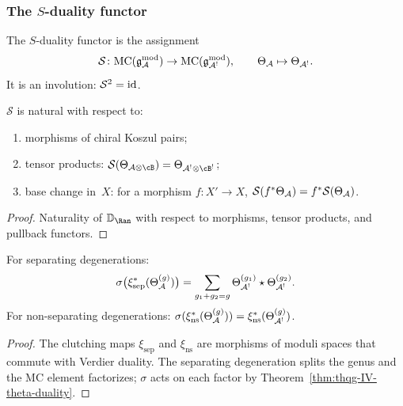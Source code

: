 \subsubsection{The $S$-duality functor}

\begin{definition}
The $S$-duality functor is the assignment
\[
\mathcal{S}\colon
\mathrm{MC}(\mathfrak{g}_{\mathcal{A}}^{\mathrm{mod}}) \to \mathrm{MC}(\mathfrak{g}_{\mathcal{A}^!}^{\mathrm{mod}}),
\qquad
\Theta_{\mathcal{A}} \mapsto \Theta_{\mathcal{A}^!}.
\]
It is an involution: $\mathcal{S}^2 = \mathrm{id}$.
\end{definition}

\begin{proposition}
$\mathcal{S}$ is natural with respect to:
\begin{enumerate}[label=\textup{(\alph*)}]
\item morphisms of chiral Koszul pairs;
\item tensor products: $\mathcal{S}(\Theta_{\cA \otimes \cB})
 = \Theta_{\cA^! \otimes \cB^!}$;
\item base change in~$X$: for a morphism $f\colon X' \to X$,
 $\mathcal{S}(f^*\Theta_{\mathcal{A}}) = f^*\mathcal{S}(\Theta_{\mathcal{A}})$.
\end{enumerate}
\end{proposition}

\begin{proof}
Naturality of $\VD_{\Ran}$ with respect to morphisms,
tensor products, and pullback functors.
\end{proof}

\begin{proposition}
\label{prop:thqg-IV-clutching}
For separating degenerations:
\begin{equation}%
\sigma\bigl(\xi_{\mathrm{sep}}^*(\Theta_\cA^{(g)})\bigr)
= \sum_{g_1+g_2=g} \Theta_{\cA^!}^{(g_1)} \star \Theta_{\cA^!}^{(g_2)}.
\end{equation}
For non-separating degenerations:
$\sigma(\xi_{\mathrm{ns}}^*(\Theta_{\mathcal{A}}^{(g)})) = \xi_{\mathrm{ns}}^*(\Theta_{\mathcal{A}^!}^{(g)})$.
\end{proposition}

\begin{proof}
The clutching maps $\xi_{\mathrm{sep}}$ and $\xi_{\mathrm{ns}}$ are
morphisms of moduli spaces that commute with Verdier duality.
The separating degeneration splits the genus and the MC element
factorizes; $\sigma$ acts on each factor by
Theorem~\ref{thm:thqg-IV-theta-duality}.
\end{proof}

